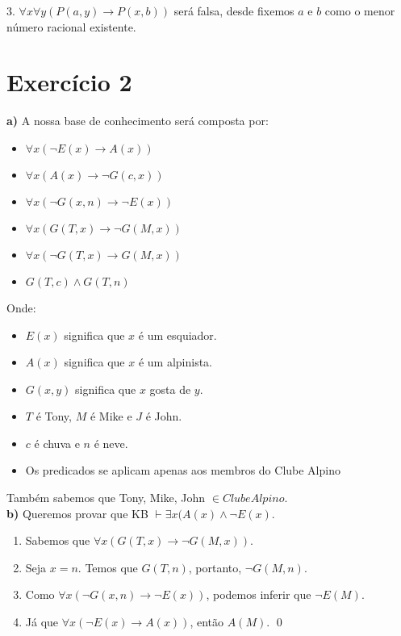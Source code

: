 \documentclass[12pt,letterpaper]{article}
\begin{document}
	3. $\forall x\forall y(P(a,y) \to P(x,b))$ será falsa, desde fixemos $a$ e $b$ como o menor número racional existente.
	
	\section*{Exercício 2}
		
	\textbf{a)} A nossa base de conhecimento será composta por:
	\begin{multicols}{2}
		\begin{itemize}
			\item $\forall x (\lnot E(x)\to A(x))$
			\item $\forall x (A(x)\to \lnot G(c,x))$
			\item $\forall x (\lnot G(x,n)\to\lnot E(x))$
			\item $\forall x (G(T,x)\to\lnot G(M,x))$
			\item $\forall x (\lnot G(T,x)\to G(M,x))$
			\item $G(T,c) \land G(T,n)$
		\end{itemize}
	\end{multicols}
	
	
	Onde:
	
	\begin{itemize}
		\item $E(x)$ significa que $x$ é um esquiador.
		\item $A(x)$ significa que $x$ é um alpinista.
		\item $G(x,y)$ significa que $x$ gosta de $y$.
		\item $T$ é Tony, $M$ é Mike e $J$ é John.
		\item $c$ é chuva e $n$ é neve.
		\item Os predicados se aplicam apenas aos membros do Clube Alpino
	\end{itemize}
	
	Também sabemos que Tony, Mike, John $\in ClubeAlpino$.\\
	
	\textbf{b)} Queremos provar que KB $\vdash \exists x (A(x) \land \lnot E(x)$.
	
	\begin{enumerate}
		\item Sabemos que $\forall x (G(T,x)\to\lnot G(M,x))$.
		\item Seja $x = n$. Temos que $G(T,n)$, portanto, 	$\lnot G(M,n)$.
		\item Como $\forall x (\lnot G(x,n)\to\lnot E(x))$, podemos inferir que $\lnot E(M)$.
		\item Já que  $\forall x (\lnot E(x)\to A(x))$, então	$A(M)$. \qed
	\end{enumerate}
	
\end{document}
